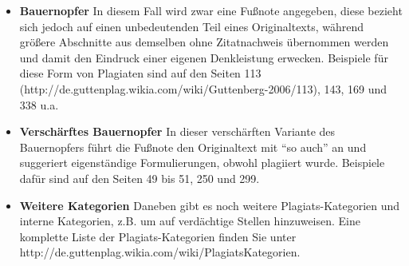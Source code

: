 \documentclass[ngerman,final,fontsize=12pt,paper=a4,twoside,BCOR=8mm,draft=false]{scrartcl}
\begin{document}
\begin{itemize}
\item \textbf{Bauernopfer} 
In diesem Fall wird zwar eine Fußnote angegeben, diese bezieht sich jedoch auf einen unbedeutenden Teil eines Originaltexts, während größere Abschnitte aus demselben ohne Zitatnachweis übernommen werden und damit den Eindruck einer eigenen Denkleistung erwecken. Beispiele für diese Form von Plagiaten sind auf den Seiten 113 (http://de.guttenplag.wikia.com/wiki/Guttenberg-2006/113), 143, 169 und 338 u.a.

\item \textbf{Verschärftes Bauernopfer} 
In dieser verschärften Variante des Bauernopfers führt die Fußnote den Originaltext mit "`so auch"' an und suggeriert eigenständige Formulierungen, obwohl plagiiert wurde. Beispiele dafür sind auf den Seiten 49 bis 51, 250 und 299.
\item \textbf{Weitere Kategorien} 
Daneben gibt es noch weitere Plagiats-Kategorien und interne Kategorien, z.B. um auf verdächtige Stellen hinzuweisen. Eine komplette Liste der Plagiats-Kategorien finden Sie unter http://de.guttenplag.wikia.com/wiki/PlagiatsKategorien.
\end{itemize}
\end{document}
